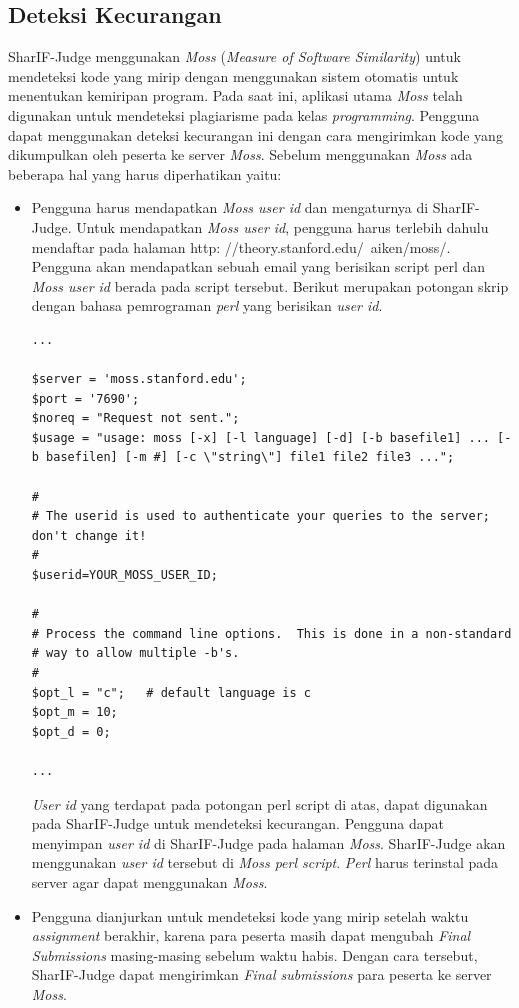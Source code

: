 \subsection{Deteksi Kecurangan}
\label{sec: Deteksi Kecurangan}
SharIF-Judge menggunakan \textit{Moss} (\textit{Measure of Software Similarity}) untuk mendeteksi kode yang mirip dengan menggunakan sistem otomatis untuk menentukan kemiripan program. Pada saat ini, aplikasi utama \textit{Moss} telah digunakan untuk mendeteksi plagiarisme pada kelas \textit{programming}. Pengguna dapat menggunakan deteksi kecurangan ini dengan cara mengirimkan kode yang dikumpulkan oleh peserta ke server \textit{Moss}. 
Sebelum menggunakan \textit{Moss} ada beberapa hal yang harus diperhatikan yaitu:
\begin{itemize}
    \item Pengguna harus mendapatkan \textit{Moss user id} dan mengaturnya di SharIF-Judge. Untuk mendapatkan \textit{Moss user id}, pengguna harus terlebih dahulu mendaftar pada halaman http:
//theory.stanford.edu/~aiken/moss/. Pengguna akan mendapatkan sebuah email yang berisikan script perl dan \textit{Moss user id} berada pada script tersebut. Berikut merupakan potongan skrip dengan bahasa pemrograman \textit{perl} yang berisikan \textit{user id}.

 \begin{lstlisting}[basicstyle=\ttfamily, frame=single,
    columns=fullflexible, breaklines=true, numbers=none]
...

$server = 'moss.stanford.edu';
$port = '7690';
$noreq = "Request not sent.";
$usage = "usage: moss [-x] [-l language] [-d] [-b basefile1] ... [-b basefilen] [-m #] [-c \"string\"] file1 file2 file3 ...";

#
# The userid is used to authenticate your queries to the server; don't change it!
#
$userid=YOUR_MOSS_USER_ID;

#
# Process the command line options.  This is done in a non-standard
# way to allow multiple -b's.
#
$opt_l = "c";   # default language is c
$opt_m = 10;
$opt_d = 0;

...
    \end{lstlisting}
\textit{User id} yang terdapat pada potongan perl script di atas, dapat digunakan pada SharIF-Judge untuk mendeteksi kecurangan. Pengguna dapat menyimpan \textit{user id} di SharIF-Judge pada halaman \textit{Moss}. SharIF-Judge akan menggunakan \textit{user id} tersebut di \textit{Moss perl script}. \textit{Perl} harus terinstal pada server agar dapat menggunakan \textit{Moss}.
    \item Pengguna dianjurkan untuk mendeteksi kode yang mirip setelah waktu \textit{assignment} berakhir, karena para peserta masih dapat mengubah \textit{Final Submissions} masing-masing sebelum waktu
    habis. Dengan cara tersebut, SharIF-Judge dapat mengirimkan \textit{Final submissions} para peserta ke server \textit{Moss}. 
\end{itemize}
